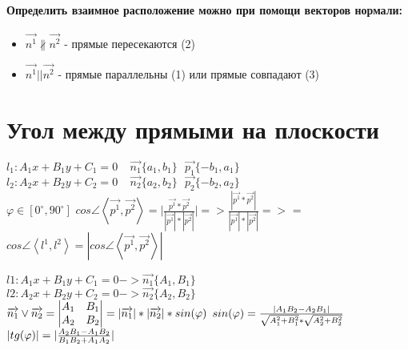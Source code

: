 \documentclass{book}
\begin{document}
\paragraph*{Определить взаимное расположение можно при помощи векторов нормали:}
\begin{itemize}
    \item $\overrightarrow{n^1} \nparallel \overrightarrow{n^2}$ - прямые пересекаются (2)
    \item $\overrightarrow{n^1} || \overrightarrow{n^2}$ - прямые параллельны (1) или прямые совпадают (3)
\end{itemize}
\section{Угол между прямыми на плоскости}
$l_1: A_1x+B_1y+C_1=0 \ \ \ \ \ \overrightarrow{n_1}\{a_1,b_1\} \ \ \ \overrightarrow{p_1}\{-b_1,a_1\}$\\
$l_2: A_2x+B_2y+C_2=0 \ \ \ \ \ \overrightarrow{n_2}\{a_2,b_2\} \ \ \ \overrightarrow{p_2}\{-b_2,a_2\}$\\
$\varphi \in [0^\circ,90^\circ]$
$cos\angle\left\langle\overrightarrow{p^1},\overrightarrow{p^2}\right\rangle=\vert\frac{\overrightarrow{p^1}*\overrightarrow{p^2}}{|\overrightarrow{p^1}|*|\overrightarrow{p^2}|}\vert => \frac{|\overrightarrow{p^1}*\overrightarrow{p^2}|}{|\overrightarrow{p^1}|*|\overrightarrow{p^2}|}=>$
=
\\
$cos\angle\left\langle l^1,l^2 \right\rangle=|cos\angle\left\langle\overrightarrow{p^1},\overrightarrow{p^2}\right\rangle|$

$l1: A_1x+B_1y+C_1=0 -> \overrightarrow{n_1}\{A_1,B_1\}$\\
$l2: A_2x+B_2y+C_2=0 -> \overrightarrow{n_2}\{A_2,B_2\}$\\
$\overrightarrow{n_1}\vee\overrightarrow{n_2}=
\begin{vmatrix}
    A_1 & B_1\\
    A_2 & B_2
\end{vmatrix}=|\overrightarrow{n_1}|*|\overrightarrow{n_2}|*sin(\varphi)\\$
$sin(\varphi)=\frac{|A_1B_2-A_2B_1|}{\sqrt{A_1^2+B_1^2}*\sqrt{A_2^2+B_2^2}}\\$
$|tg(\varphi)|=|\frac{A_2B_1-A_1B_2}{B_1B_2+A_1A_2}|\\$
\end{document}
